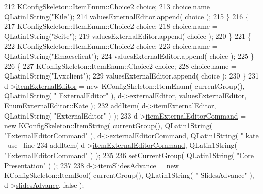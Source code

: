 \begin{DoxyCode}
212     KConfigSkeleton::ItemEnum::Choice2 choice;
213     choice.name = QLatin1String(\textcolor{stringliteral}{"Kile"});
214     valuesExternalEditor.append( choice );
215   \}
216   \{
217     KConfigSkeleton::ItemEnum::Choice2 choice;
218     choice.name = QLatin1String(\textcolor{stringliteral}{"Scite"});
219     valuesExternalEditor.append( choice );
220   \}
221   \{
222     KConfigSkeleton::ItemEnum::Choice2 choice;
223     choice.name = QLatin1String(\textcolor{stringliteral}{"Emacsclient"});
224     valuesExternalEditor.append( choice );
225   \}
226   \{
227     KConfigSkeleton::ItemEnum::Choice2 choice;
228     choice.name = QLatin1String(\textcolor{stringliteral}{"Lyxclient"});
229     valuesExternalEditor.append( choice );
230   \}
231   d->\hyperlink{classOkular_1_1SettingsCorePrivate_aae0212ef7eab85cc329d71fcb28c16fe}{itemExternalEditor} = \textcolor{keyword}{new} KConfigSkeleton::ItemEnum( currentGroup(), QLatin1String( \textcolor{stringliteral}{"
      ExternalEditor"} ), d->\hyperlink{classOkular_1_1SettingsCorePrivate_af0218eba4a88280bdba51f897a69dcbd}{externalEditor}, valuesExternalEditor, 
      \hyperlink{classOkular_1_1SettingsCore_1_1EnumExternalEditor_a933c39b8e6ad3e1646a01bfad4197614a983e6f3a87bdf4fb13db73a52b85a77c}{EnumExternalEditor::Kate} );
232   addItem( d->\hyperlink{classOkular_1_1SettingsCorePrivate_aae0212ef7eab85cc329d71fcb28c16fe}{itemExternalEditor}, QLatin1String( \textcolor{stringliteral}{"ExternalEditor"} ) );
233   d->\hyperlink{classOkular_1_1SettingsCorePrivate_a469d8f43886ab0df9650865b68dd911f}{itemExternalEditorCommand} = \textcolor{keyword}{new} KConfigSkeleton::ItemString( currentGroup(), 
      QLatin1String( \textcolor{stringliteral}{"ExternalEditorCommand"} ), d->\hyperlink{classOkular_1_1SettingsCorePrivate_a42790939dfdac0ad0671710bce6aac67}{externalEditorCommand}, QLatin1String( \textcolor{stringliteral}{"
      kate --use --line %
234   addItem( d->\hyperlink{classOkular_1_1SettingsCorePrivate_a469d8f43886ab0df9650865b68dd911f}{itemExternalEditorCommand}, QLatin1String( \textcolor{stringliteral}{"ExternalEditorCommand"} ) 
      );
235 
236   setCurrentGroup( QLatin1String( \textcolor{stringliteral}{"Core Presentation"} ) );
237 
238   d->\hyperlink{classOkular_1_1SettingsCorePrivate_a0fd9d5aaed5f7710aa864b4a14205fce}{itemSlidesAdvance} = \textcolor{keyword}{new} KConfigSkeleton::ItemBool( currentGroup(), QLatin1String( \textcolor{stringliteral}{"
      SlidesAdvance"} ), d->\hyperlink{classOkular_1_1SettingsCorePrivate_a2f5216596525d18888fe9ca9f50a149e}{slidesAdvance}, \textcolor{keyword}{false} );
}
\end{DoxyCode}

